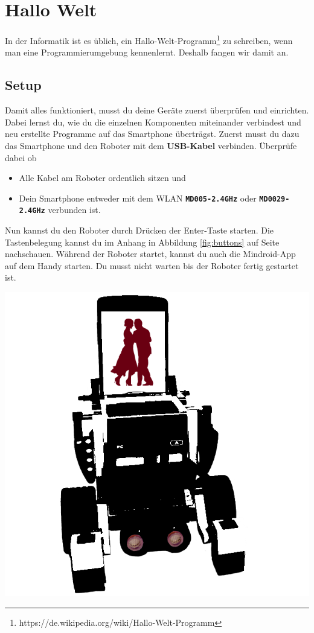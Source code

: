 \documentclass[
	12pt,
	colorbacktitle,
	accentcolor=tud1c,
	draft,
	twoside,
	german
]{tudexercise}
\newcommand{\bfcode}[1]{\texttt{\textbf{#1}}}
\begin{document}
	
		
	\newpage
	
	\section{Hallo Welt}
	In der Informatik ist es üblich, ein Hallo-Welt-Programm\footnote{https://de.wikipedia.org/wiki/Hallo-Welt-Programm} zu schreiben, wenn man eine Programmierumgebung kennenlernt. Deshalb fangen wir damit an. 
	
	\subsection{Setup}
	Damit alles funktioniert, musst du deine Geräte zuerst überprüfen und einrichten. Dabei lernst du, wie du die einzelnen Komponenten miteinander verbindest und neu erstellte Programme auf das Smartphone überträgst.
	Zuerst musst du dazu das Smartphone und den Roboter mit dem \textbf{USB-Kabel} verbinden. Überprüfe dabei ob
	\begin{itemize}
		\item Alle Kabel am Roboter ordentlich sitzen und
		\item Dein Smartphone entweder mit dem WLAN \bfcode{MD005-2.4GHz} oder \bfcode{MD0029-2.4GHz} verbunden ist.
	\end{itemize}
	\begin{minipage}{.8\textwidth}
		Nun kannst du den Roboter durch Drücken der Enter-Taste starten.
		Die Tastenbelegung kannst du im Anhang in Abbildung \ref{fig:buttons} auf Seite \pageref{fig:buttons} nachschauen. Während der Roboter startet, kannst du auch die Mindroid-App auf dem Handy starten.
		Du musst nicht warten bis der Roboter fertig gestartet ist.
	\end{minipage}
	\begin{minipage}{.19\textwidth}
	\includegraphics[width=\textwidth]{img/app_logo}	
	\end{minipage}
	
\end{document}
